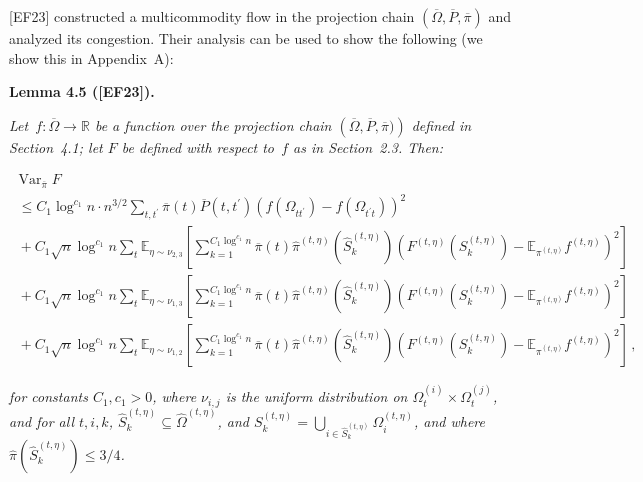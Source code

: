 \documentclass[10pt,a4paper]{article}
\begin{document}
[EF23] constructed a multicommodity flow in the projection chain $(\overline{\Omega},\overline{P},\overline{\pi})$ and analyzed its congestion. Their analysis can be used to show the following (we show this in Appendix A):\par





\par\medskip\noindent\textbf{\textbf{Lemma 4.5}\textbf{ }([EF23])\textbf{.}}\par



\emph{Let $f:\overline{\Omega}\rightarrow\mathbb{R}$ be a function over the projection chain $\left(\overline{\Omega},\overline{P},\overline{\pi})\right)$ defined in Section 4.1; let $F$ be defined with respect to $f$ as in Section 2.3. Then:}\par


\[\begin{gathered}
\displaystyle\operatorname{Var}_{\overline{\pi}}F \\
\displaystyle~\leq C_{1}\log^{c_{1}}n\cdot n^{3/2}\sum_{t,t^{\prime}}\overline{\pi}(t)\overline{P}(t,t^{\prime})(f(\Omega_{tt^{\prime}})-f(\Omega_{t^{\prime}t}))^{2} \\
\displaystyle~+C_{1}\sqrt{n}\log^{c_{1}}n\sum_{t}\mathbb{E}_{\eta\sim\nu_{2,3}}\left[\sum_{k=1}^{C_{1}\log^{c_{1}}n}\overline{\pi}(t)\hat{\pi}^{(t,\eta)}\left(\hat{S}_{k}^{(t,\eta)}\right)\left(F^{(t,\eta)}(S_{k}^{(t,\eta)})-\mathbb{E}_{\pi^{(t,\eta)}}f^{(t,\eta)}\right)^{2}\right] \\
\displaystyle~+C_{1}\sqrt{n}\log^{c_{1}}n\sum_{t}\mathbb{E}_{\eta\sim\nu_{1,3}}\left[\sum_{k=1}^{C_{1}\log^{c_{1}}n}\overline{\pi}(t)\hat{\pi}^{(t,\eta)}\left(\hat{S}_{k}^{(t,\eta)}\right)\left(F^{(t,\eta)}(S_{k}^{(t,\eta)})-\mathbb{E}_{\pi^{(t,\eta)}}f^{(t,\eta)}\right)^{2}\right] \\
\displaystyle~+C_{1}\sqrt{n}\log^{c_{1}}n\sum_{t}\mathbb{E}_{\eta\sim\nu_{1,2}}\left[\sum_{k=1}^{C_{1}\log^{c_{1}}n}\overline{\pi}(t)\hat{\pi}^{(t,\eta)}\left(\hat{S}_{k}^{(t,\eta)}\right)\left(F^{(t,\eta)}(S_{k}^{(t,\eta)})-\mathbb{E}_{\pi^{(t,\eta)}}f^{(t,\eta)}\right)^{2}\right]\,,
\end{gathered}\]


\emph{for constants $C_{1},c_{1}>0$,
where $\nu_{i,j}$ is the uniform distribution on $\Omega_{t}^{(i)}\times\Omega_{t}^{(j)}$, and
for all $t,i,k$, $\hat{S}_{k}^{(t,\eta)}\subseteq\hat{\Omega}^{(t,\eta)}$, and $S_{k}^{(t,\eta)}=\bigcup_{i\in\hat{S}_{k}^{(t,\eta)}}\Omega_{i}^{(t,\eta)}$, and where $\hat{\pi}(\hat{S}_{k}^{(t,\eta)})\leq 3/4$.}\par
\end{document}
